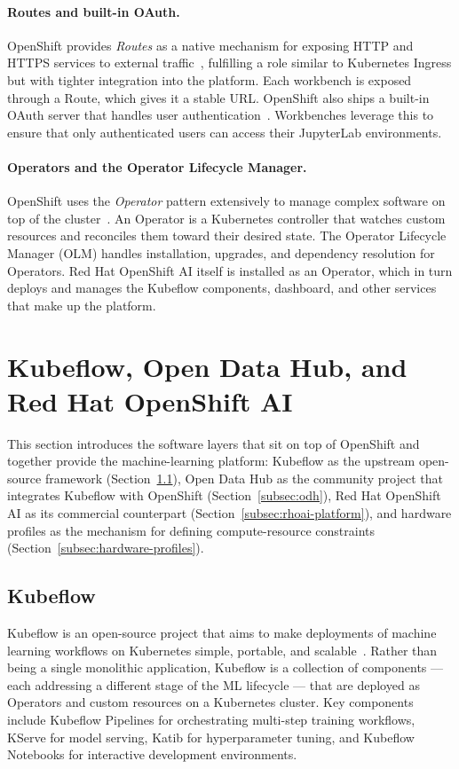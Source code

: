 \documentclass[
  digital,     %
  oneside,     %
  nosansbold,  %
  nocolorbold, %
  lof,         %
  lot,         %
]{fithesis4}
\begin{document}
\paragraph{Routes and built-in OAuth.}
OpenShift provides \emph{Routes} as a native mechanism for exposing HTTP and
HTTPS services to external traffic~\parencite{openshift-routes}, fulfilling
a role similar to Kubernetes Ingress but with tighter integration into the
platform. Each workbench is exposed through a Route, which gives it a stable
URL. OpenShift also ships a built-in OAuth server that handles user
authentication~\parencite{openshift-oauth}. Workbenches leverage this to
ensure that only authenticated users can access their JupyterLab environments.

\paragraph{Operators and the Operator Lifecycle Manager.}
OpenShift uses the \emph{Operator} pattern extensively to manage complex
software on top of the cluster~\parencite{openshift-operators}. An Operator is
a Kubernetes controller that watches custom resources and reconciles them toward
their desired state. The Operator Lifecycle Manager (OLM) handles installation,
upgrades, and dependency resolution for Operators. Red Hat OpenShift AI itself
is installed as an Operator, which in turn deploys and manages the Kubeflow
components, dashboard, and other services that make up the platform.

\section{Kubeflow, Open Data Hub, and Red Hat OpenShift AI}
\label{sec:kubeflow-odh-rhoai}

This section introduces the software layers that sit on top of OpenShift and
together provide the machine-learning platform: Kubeflow as the upstream
open-source framework (Section~\ref{subsec:kubeflow}), Open Data Hub as the
community project that integrates Kubeflow with OpenShift
(Section~\ref{subsec:odh}), Red Hat OpenShift AI as its commercial counterpart
(Section~\ref{subsec:rhoai-platform}), and hardware profiles as the mechanism
for defining compute-resource constraints
(Section~\ref{subsec:hardware-profiles}).

\subsection{Kubeflow}
\label{subsec:kubeflow}
Kubeflow is an open-source project that aims to make deployments of machine
learning workflows on Kubernetes simple, portable, and
scalable~\parencite{kubeflow-docs}. Rather than being a single monolithic
application, Kubeflow is a collection of components --- each
addressing a different stage of the ML lifecycle --- that are deployed as
Operators and custom resources on a Kubernetes cluster. Key components include
Kubeflow Pipelines for orchestrating multi-step training workflows, KServe for
model serving, Katib for hyperparameter tuning, and Kubeflow Notebooks for
interactive development environments.
\end{document}

